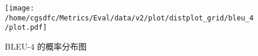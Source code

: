 \begin{figure}[H]%
\centering%
\texttt{[image: /home/cgsdfc/Metrics/Eval/data/v2/plot/distplot\_grid/bleu\_4/plot.pdf]}%
\caption{BLEU{-}4 的概率分布图}%
\label{fig:BLEU{-}4dist}%
\end{figure}